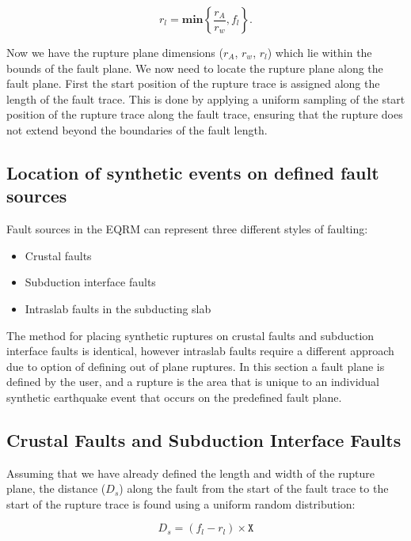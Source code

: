 \begin{equation}
r_l = \mathbf{min}\left\{\frac{r_A}{r_w}, f_l\right\} .
\end{equation}

Now we have the rupture plane dimensions ($r_A$, $r_w$, $r_l$) which lie within the bounds of the fault plane. We now need to locate the rupture plane along the fault plane. 
First the start position of the rupture trace is assigned along the length of the fault trace. 
This is done by applying a uniform sampling of the start position of the rupture trace along the fault trace, ensuring that the rupture does not extend 
beyond the boundaries of the fault length.


\subsection{Location of synthetic events on defined fault sources}
\label{sec:fault_locn}

Fault sources in the EQRM can represent three different styles of faulting:

\begin{itemize}
\item Crustal faults
\item Subduction interface faults
\item Intraslab faults in the subducting slab
\end{itemize}

The method for placing synthetic ruptures on crustal faults and subduction interface faults is identical, however intraslab faults require a 
different approach due to option of defining out of plane ruptures. In this section a fault plane is defined by the user, and
a rupture is the area that is unique to an individual synthetic earthquake event that occurs on the predefined fault plane.

\subsection{Crustal Faults and Subduction Interface Faults}
Assuming that we have already defined the length and width of the rupture plane, the distance ($D_s$) along the fault from the start of the fault trace to
the start of the rupture trace is found using a uniform random distribution:

\begin{equation} \label{eq:ds}
D_s = (f_l - r_l) \times \mathtt{X}
\end{equation}

